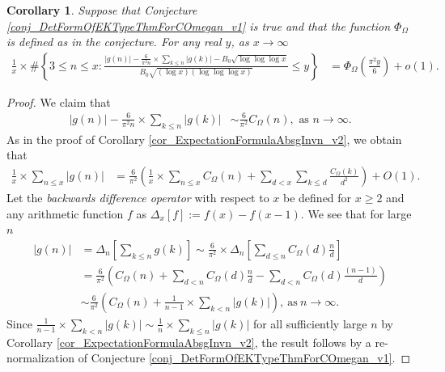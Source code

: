 \documentclass[11pt,reqno,a4letter]{article}
\newcommand{\hlocalref}[1]{\hyperref[#1]{\ref{#1}}}
\numberwithin{equation}{section}
\numberwithin{figure}{section}
\numberwithin{table}{section}
\theoremstyle{plain}
\newtheorem{cor}[theorem]{Corollary}
\numberwithin{theorem}{section}
\theoremstyle{definition}
\begin{document}
\begin{cor}
\label{cor_CLT_VII} 
Suppose that Conjecture \hlocalref{conj_DetFormOfEKTypeThmForCOmegan_v1} is true and that 
the function $\Phi_{\Omega}$ is defined as in the conjecture. 
For any real $y$, as $x \rightarrow \infty$ 
\begin{align*} 
\frac{1}{x} \times \#\left\{3 \leq n \leq x: \frac{|g(n)| - 
     \frac{6}{\pi^2 n} \times \sum_{k \leq n} |g(k)| - B_0 \sqrt{\log\log\log x}}{ 
      B_0 \sqrt{(\log x) (\log\log\log x)}} \leq y\right\} & = 
     \Phi_{\Omega}\left(\frac{\pi^2 y}{6}\right) + o(1).
\end{align*} 
\end{cor} 
\begin{proof} 
We claim that 
\begin{align*} 
|g(n)| - \frac{6}{\pi^2 n} \times \sum_{k \leq n} |g(k)| & \sim \frac{6}{\pi^2} C_{\Omega}(n), 
     \text{\ as\ } n \rightarrow \infty. 
\end{align*} 
As in the proof of Corollary \hlocalref{cor_ExpectationFormulaAbsgInvn_v2}, 
we obtain that 
\begin{align*} 
\frac{1}{x} \times \sum_{n \leq x} |g(n)| & = 
     \frac{6}{\pi^2} \left(\frac{1}{x} \times \sum_{n \leq x} C_{\Omega}(n) + \sum_{d<x} 
     \sum_{k \leq d} \frac{C_{\Omega}(k)}{d^2}\right) + O(1). 
\end{align*} 
Let the \emph{backwards difference operator} with respect to $x$ 
be defined for $x \geq 2$ and any arithmetic function $f$ as 
$\Delta_x[f] := f(x) - f(x-1)$. 
We see that for large $n$ 
\begin{align*} 
     |g(n)| & = \Delta_n\left[\sum_{k \leq n} g(k)\right]  
     \sim \frac{6}{\pi^2} \times 
     \Delta_n\left[\sum_{d \leq n} C_{\Omega}(d) \frac{n}{d}\right] \\ 
     & = \frac{6}{\pi^2}\left(C_{\Omega}(n) + \sum_{d < n} C_{\Omega}(d) \frac{n}{d} - 
     \sum_{d<n} C_{\Omega}(d) \frac{(n-1)}{d}\right) \\ 
     & \sim \frac{6}{\pi^2} \left(C_{\Omega}(n) + \frac{1}{n-1} \times \sum_{k < n} |g(k)|\right), 
     \mathrm{\ as\ } n \rightarrow \infty. 
\end{align*} 
Since $\frac{1}{n-1} \times \sum_{k < n} |g(k)| \sim \frac{1}{n} \times \sum_{k \leq n} |g(k)|$ 
for all sufficiently large $n$ by 
Corollary \hlocalref{cor_ExpectationFormulaAbsgInvn_v2}, 
the result follows by a re-normalization of Conjecture \hlocalref{conj_DetFormOfEKTypeThmForCOmegan_v1}. 
\end{proof} 
\end{document}
